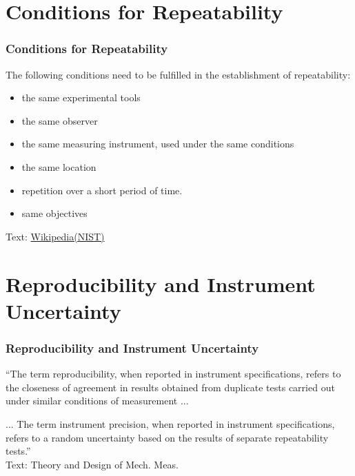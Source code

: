 \documentclass[fleqn]{beamer} %
\newcommand{\sectiontitleII}{Conditions for Repeatability}
\newcommand{\sectiontitleIII}{Reproducibility and Instrument Uncertainty}
\begin{document}
\section{\sectiontitleII}

\begin{frame}[label=sectionII]
\frametitle{\sectiontitleII}

The following conditions need to be fulfilled in the establishment of repeatability:
\begin{itemize}

\item the same experimental tools
\item the same observer
\item the same measuring instrument, used under the same conditions
\item the same location
\item repetition over a short period of time.
\item same objectives


\end{itemize}
\vspace{5mm}
{\tiny Text: \href{https://en.wikipedia.org/wiki/Repeatability}{Wikipedia(NIST)} }

\end{frame}

\section{\sectiontitleIII}

\begin{frame}[label=sectionIII]
\frametitle{\sectiontitleIII}

``The term {\GR reproducibility}, when reported in instrument specifications, refers to the closeness of
agreement in results obtained from duplicate tests carried out under similar conditions of
measurement ... \vspcc

... The term {\PR instrument precision}, when reported in instrument specifications, refers to a random
uncertainty based on the results of separate repeatability tests.'' \vspace{10mm} \\

{\tiny Text: Theory and Design of Mech. Meas.}

\end{frame}
\end{document}
